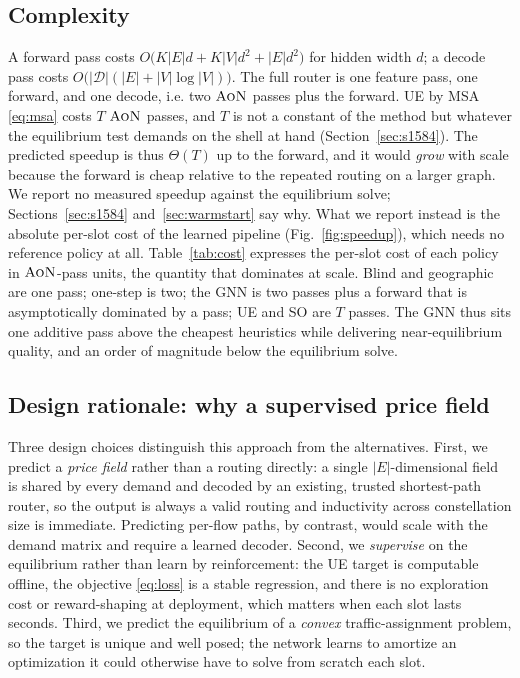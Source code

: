 \documentclass[journal]{IEEEtran}
\newcommand{\AoN}{\textsc{AoN}}
\begin{document}
\subsection{Complexity}\label{sec:complexity}
A forward pass costs $O\!\big(K|E|d+K|V|d^2+|E|d^2\big)$ for hidden width $d$; a decode
pass costs $O\!\big(|\mathcal{D}|(|E|+|V|\log|V|)\big)$. The full router is one feature
pass, one forward, and one decode, i.e. two $\AoN$ passes plus the forward. UE by MSA
\eqref{eq:msa} costs $T$ $\AoN$ passes, and $T$ is not a constant of the method but whatever
the equilibrium test demands on the shell at hand (Section~\ref{sec:s1584}). The predicted
speedup is thus $\Theta(T)$ up to the forward, and it would \emph{grow} with scale because
the forward is cheap relative to the repeated routing on a larger graph. We report no
measured speedup against the equilibrium solve; Sections~\ref{sec:s1584}
and~\ref{sec:warmstart} say why. What we report instead is the absolute per-slot cost of
the learned pipeline (Fig.~\ref{fig:speedup}), which needs no reference policy at all.
Table~\ref{tab:cost} expresses the per-slot cost of each policy
in $\AoN$-pass units, the quantity that dominates at scale. Blind and geographic are one
pass; one-step is two; the GNN is two passes plus a forward that is asymptotically
dominated by a pass; UE and SO are $T$ passes. The GNN thus sits one additive pass above
the cheapest heuristics while delivering near-equilibrium quality, and an order of
magnitude below the equilibrium solve.



\subsection{Design rationale: why a supervised price field}
Three design choices distinguish this approach from the alternatives. First, we predict
a \emph{price field} rather than a routing directly: a single $|E|$-dimensional field is
shared by every demand and decoded by an existing, trusted shortest-path router, so the
output is always a valid routing and inductivity across constellation size is immediate.
Predicting per-flow paths, by contrast, would scale with the demand matrix and require a
learned decoder. Second, we \emph{supervise} on the equilibrium rather than learn by
reinforcement: the UE target is computable offline, the objective \eqref{eq:loss} is a
stable regression, and there is no exploration cost or reward-shaping at deployment,
which matters when each slot lasts seconds. Third, we predict the equilibrium of a
\emph{convex} traffic-assignment problem, so the target is unique and well posed; the
network learns to amortize an optimization it could otherwise have to solve from scratch
each slot.
\end{document}
